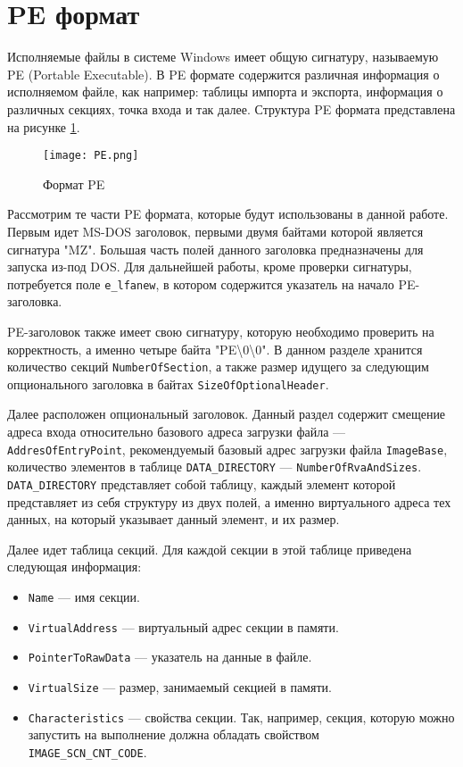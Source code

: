 
\section{PE формат}
Исполняемые файлы в системе Windows имеет общую сигнатуру, называемую
PE (Portable Executable). В PE формате содержится различная информация о
исполняемом файле, как например: таблицы импорта и экспорта, информация о
различных секциях, точка входа и так далее. Структура PE формата представлена на
рисунке \ref{fig:PE}.
\begin{figure}[htb]
  \centering
  \texttt{[image: PE.png]}
  \caption{Формат PE}
  \label{fig:PE}
\end{figure}

Рассмотрим те части PE формата, которые будут использованы в данной работе.
Первым идет MS-DOS заголовок, первыми двумя байтами которой является сигнатура
"MZ". Большая часть полей данного заголовка предназначены для запуска из-под
DOS. Для дальнейшей работы, кроме проверки сигнатуры, потребуется поле
\verb!e_lfanew!, в котором содержится указатель на начало PE-заголовка.

PE-заголовок также имеет свою сигнатуру, которую необходимо проверить на
корректность, а именно четыре байта "PE\textbackslash0\textbackslash0". В данном
разделе хранится количество секций \verb!NumberOfSection!, а также размер
идущего за следующим опционального заголовка в байтах
\verb!SizeOfOptionalHeader!.

Далее расположен опциональный заголовок. Данный раздел содержит смещение адреса
входа относительно базового адреса загрузки файла --- \\
\verb!AddresOfEntryPoint!, рекомендуемый базовый адрес загрузки файла
\verb!ImageBase!, количество элементов в таблице \verb!DATA_DIRECTORY! ---
\verb!NumberOfRvaAndSizes!.  \verb!DATA_DIRECTORY! представляет собой таблицу,
каждый элемент которой представляет из себя структуру из двух полей, а именно
виртуального адреса тех данных, на который указывает данный элемент, и их размер. 

Далее идет таблица секций. Для каждой секции в этой таблице приведена следующая
информация:
\begin{itemize}
  \item \verb!Name! --- имя секции. 
  \item \verb!VirtualAddress! --- виртуальный адрес секции в памяти.
  \item \verb!PointerToRawData! --- указатель на данные в файле.
  \item \verb!VirtualSize! --- размер, занимаемый секцией в памяти.
  \item \verb!Characteristics! --- свойства секции. Так, например, секция,
    которую можно запустить на выполнение должна обладать свойством
    \\ \verb!IMAGE_SCN_CNT_CODE!.
\end{itemize}

